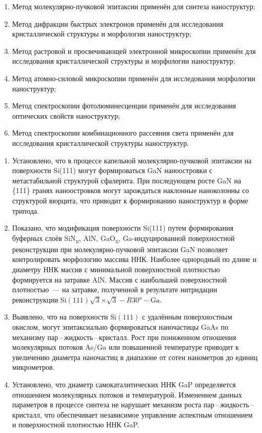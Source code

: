 {\methods}
\begin{enumerate}[beginpenalty=10000]
  \item Метод молекулярно-пучковой эпитаксии применён для синтеза наноструктур;
  \item Метод дифракции быстрых электронов применён для исследования кристаллической структуры и морфологии наноструктур;
  \item Метод растровой и просвечивающей электронной микроскопии применён для исследования кристаллической структуры и морфологии наноструктур;
  \item Метод атомно-силовой микроскопии применён для исследования морфологии наноструктур;
  \item Метод спектроскопии фотолюминесценции применён для исследования оптических свойств наноструктур;
  \item Метод спектроскопии комбинационного рассеяния света применён для исследования кристаллической структуры наноструктур.
\end{enumerate}

{} \begin{enumerate}[beginpenalty=10000]
\item Установлено, что в процессе капельной молекулярно-пучковой эпитаксии на
  поверхности Si(111) могут формироваться GaN наноостровки с метастабильной
  структурой сфалерита. При последующем росте GaN
на \{111\} гранях наноостровков могут зарождаться наклонные наноколонны со
структурой вюрцита, что приводит к формированию наноструктур в форме трипода.
\item Показано, что модификация поверхности Si(111) путем
  формирования буферных слоёв SiN\textsubscript{x}, AlN, GaO\textsubscript{x},
  Ga-индуцированной поверхностной реконструкции при молекулярно-пучковой
  эпитаксии GaN позволяет контролировать морфологию массива ННК. Наиболее
  однородный по длине и диаметру ННК массив с минимальной поверхностной
  плотностью формируется на затравке AlN. Массив с наибольшей поверхностной
  плотностью~--- на затравке, полученной в результате нитридации реконструкции
  Si\((111)\sqrt{3}\)\(\times\)\(\sqrt{3} - R30\si{\degree} - \text{Ga}\).
\item Выявлено, что на поверхности Si\((111)\) с удалённым поверхностным
  окислом, могут эпитаксиально формироваться наночастицы GaAs по механизму
  пар\,--\,жидкость\,--\,кристалл. Рост при пониженном отношения молекулярных
  потоков As/Ga или повышенной температуре приводит к увеличению диаметра
  наночастиц в диапазоне от сотен нанометров до единиц микрометров.
\item Установлено, что диаметр самокаталитических ННК GaP определяется
  отношением молекулярных потоков и температурой. Изменением данных параметров
  в процессе синтеза не нарушает механизм роста
  пар\,--\,жидкость\,--\,кристалл, что обеспечивает независимое управление
  аспектным отношением и поверхностной плотностью ННК GaP.
\end{enumerate}

